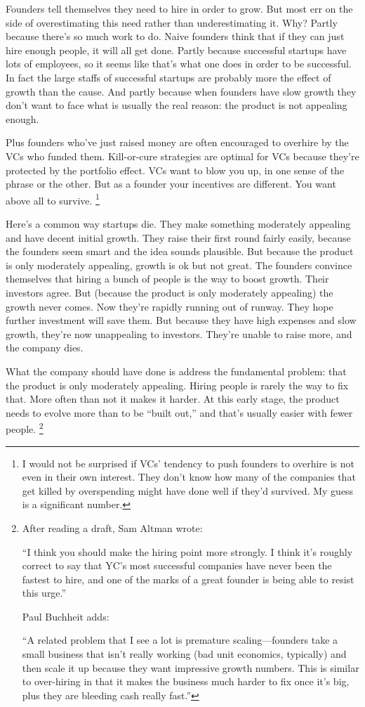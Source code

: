 Founders tell themselves they need to hire in order to grow. But most
err on the side of overestimating this need rather than underestimating
it. Why? Partly because there's so much work to do. Naive founders think
that if they can just hire enough people, it will all get done. Partly
because successful startups have lots of employees, so it seems like
that's what one does in order to be successful. In fact the large staffs
of successful startups are probably more the effect of growth than the
cause. And partly because when founders have slow growth they don't want
to face what is usually the real reason: the product is not appealing
enough.

Plus founders who've just raised money are often encouraged to overhire
by the VCs who funded them. Kill-or-cure strategies are optimal for VCs
because they're protected by the portfolio effect. VCs want to blow you
up, in one sense of the phrase or the other. But as a founder your
incentives are different. You want above all to survive.
\footnote{I would not be surprised if VCs' tendency to push founders to
overhire is not even in their own interest. They don't know how many of
the companies that get killed by overspending might have done well if
they'd survived. My guess is a significant number.}

Here's a common way startups die. They make something moderately
appealing and have decent initial growth. They raise their first round
fairly easily, because the founders seem smart and the idea sounds
plausible. But because the product is only moderately appealing, growth
is ok but not great. The founders convince themselves that hiring a
bunch of people is the way to boost growth. Their investors agree. But
(because the product is only moderately appealing) the growth never
comes. Now they're rapidly running out of runway. They hope further
investment will save them. But because they have high expenses and slow
growth, they're now unappealing to investors. They're unable to raise
more, and the company dies.

What the company should have done is address the fundamental problem:
that the product is only moderately appealing. Hiring people is rarely
the way to fix that. More often than not it makes it harder. At this
early stage, the product needs to evolve more than to be ``built out,''
and that's usually easier with fewer people. \footnote{After reading a draft, Sam Altman wrote:

``I think you should make the hiring point more strongly. I think it's
roughly correct to say that YC's most successful companies have never
been the fastest to hire, and one of the marks of a great founder is
being able to resist this urge.''

Paul Buchheit adds:

``A related problem that I see a lot is premature scaling---founders
take a small business that isn't really working (bad unit economics,
typically) and then scale it up because they want impressive growth
numbers. This is similar to over-hiring in that it makes the business
much harder to fix once it's big, plus they are bleeding cash really
fast.''}

